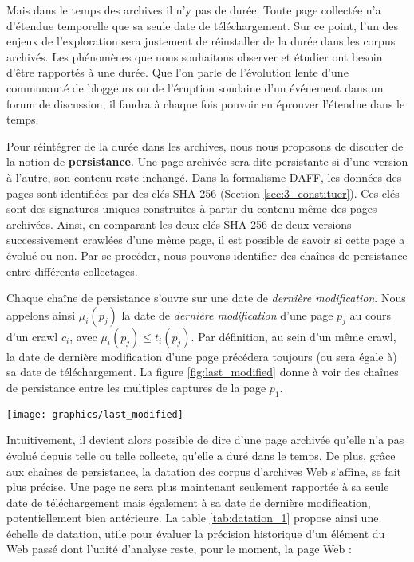 \documentclass[symmetric,justified,marginals=raggedouter]{tufte-book}
\begin{document}
Mais dans le temps des archives il n'y pas de durée. Toute page collectée n'a d'étendue temporelle que sa seule date de téléchargement. Sur ce point, l'un des enjeux de l'exploration sera justement de réinstaller de la durée dans les corpus archivés. Les phénomènes que nous souhaitons observer et étudier ont besoin d'être rapportés à une durée. Que l'on parle de l'évolution lente d'une communauté de bloggeurs ou de l'éruption soudaine d'un événement dans un forum de discussion, il faudra à chaque fois pouvoir en éprouver l'étendue dans le temps. 

Pour réintégrer de la durée dans les archives, nous nous proposons de discuter de la notion de \textbf{persistance}. Une page archivée sera dite persistante si d'une version à l'autre, son contenu reste inchangé. Dans la formalisme DAFF, les données des pages sont identifiées par des clés SHA-256 (Section \ref{sec:3_constituer}). Ces clés sont des signatures uniques construites à partir du contenu même des pages archivées. Ainsi, en comparant les deux clés SHA-256 de deux versions successivement crawlées d'une même page, il est possible de savoir si cette page a évolué ou non. Par se procéder, nous pouvons identifier des chaînes de persistance entre différents collectages.

Chaque chaîne de persistance s'ouvre sur une date de \textit{dernière modification}. Nous appelons ainsi $\mu_i(p_j)$ la date de \textit{dernière modification} d'une page $p_j$ au cours d'un crawl $c_i$, avec $\mu_i(p_j) \leq t_i(p_j)$. Par définition, au sein d'un même crawl, la date de dernière modification d'une page précédera toujours (ou sera égale à) sa date de téléchargement. La figure \ref{fig:last_modified} donne à voir des chaînes de persistance entre les multiples captures de la page $p_1$.

\begin{figure*}%
  \texttt{[image: graphics/last\_modified]}
  \caption{Chaînes de persistance entre captures (bleu) et dates de dernière modification (rouge) pour la page $p_1$}
  \label{fig:last_modified}
\end{figure*}

\noindent Intuitivement, il devient alors possible de dire d'une page archivée qu'elle n'a pas évolué depuis telle ou telle collecte, qu'elle a duré dans le temps. De plus, grâce aux chaînes de persistance, la datation des corpus d'archives Web s'affine, se fait plus précise. Une page ne sera plus maintenant seulement rapportée à sa seule date de téléchargement mais également à sa date de dernière modification, potentiellement bien antérieure. La table \ref{tab:datation_1} propose ainsi une échelle de datation, utile pour évaluer la précision historique d'un élément du Web passé dont l'unité d'analyse reste, pour le moment, la page Web :\\
\end{document}
